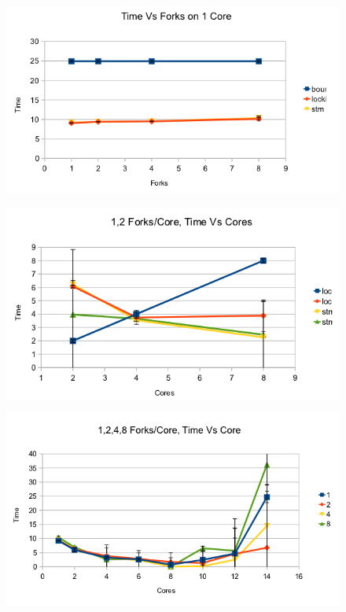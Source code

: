 \documentclass{bioinfo}
\begin{document}
\begin{figure}[h]
\includegraphics[width=\linewidth]{time-on-1-core.png}
\caption{}
\end{figure}
\begin{figure}[h]
\includegraphics[width=\linewidth]{time-and-forks-on-cores.png}
\caption{}
\end{figure}
\begin{figure}[h]
\includegraphics[width=\linewidth]{time-and-forks-on-cores-again.png}
\caption{}
\end{figure}
\end{document}
